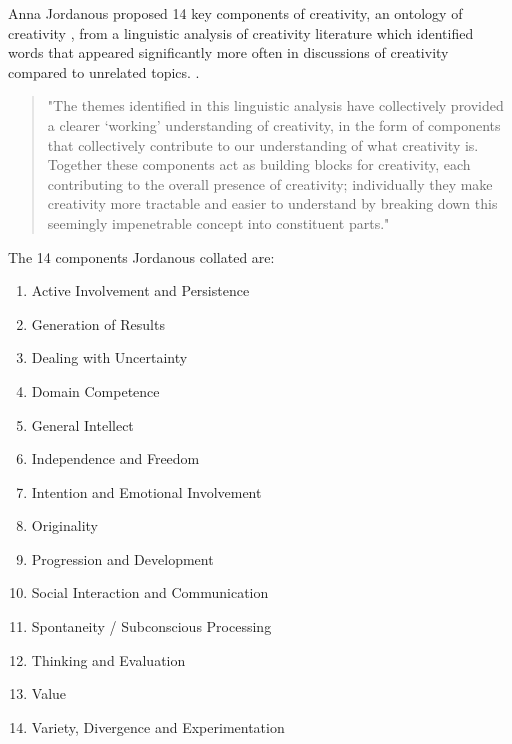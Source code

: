 Anna Jordanous proposed 14 key components of creativity, an ontology of creativity \citep[p.104-120]{Jordanous2012}, from a linguistic analysis of creativity literature which identified words that appeared significantly more often in discussions of creativity compared to unrelated topics. \citep[p.120]{Jordanous2012}.

\begin{quote}
"The themes identified in this linguistic analysis have collectively provided a clearer ‘working’ understanding of creativity, in the form of components that collectively contribute to our understanding of what creativity is. Together these components act as building blocks for creativity, each contributing to the overall presence of creativity; individually they make creativity more tractable and easier to understand by breaking down this seemingly impenetrable concept into constituent parts."  \citep[p.120]{Jordanous2012}
\end{quote}

The 14 components Jordanous collated are: \citep[p.118-120]{Jordanous2012}
\begin{enumerate}
\item Active Involvement and Persistence
\item Generation of Results
\item Dealing with Uncertainty
\item Domain Competence
\item General Intellect
\item Independence and Freedom
\item Intention and Emotional Involvement
\item Originality
\item Progression and Development
\item Social Interaction and Communication
\item Spontaneity / Subconscious Processing
\item Thinking and Evaluation
\item Value
\item Variety, Divergence and Experimentation
\end{enumerate}

